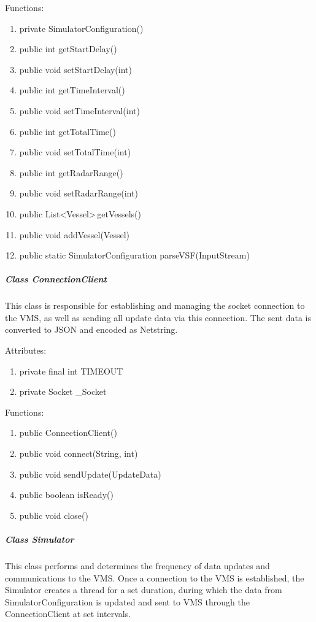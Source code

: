 \documentclass{article}
\begin{document}
\vspace{0.5cm}
Functions:
\begin{enumerate}
	\item private SimulatorConfiguration()
	\item public int getStartDelay()
	\item public void setStartDelay(int)
	\item public int getTimeInterval()
	\item public void setTimeInterval(int)
	\item public int getTotalTime()
	\item public void setTotalTime(int)
	\item public int getRadarRange()
	\item public void setRadarRange(int)
	\item public List\textless Vessel\textgreater  \,getVessels()
	\item public void addVessel(Vessel)
	\item public static SimulatorConfiguration parseVSF(InputStream)
\end{enumerate}

\break
\subparagraph{Class ConnectionClient}
This class is responsible for establishing and managing the socket connection to the VMS, as well as sending all update data via this connection. The sent data is converted to JSON and encoded as Netstring.

\vspace{0.5cm}
Attributes:
\begin{enumerate}
	\item private final int TIMEOUT
    \item private Socket \_Socket
\end {enumerate}

\vspace{0.5cm}
Functions:
\begin{enumerate}
	\item public ConnectionClient()
	\item public void connect(String, int)
	\item public void sendUpdate(UpdateData)
	\item public boolean isReady()
	\item public void close()
\end{enumerate}

\subparagraph{Class Simulator}
This class performs and determines the frequency of data updates and communications to the VMS. Once a connection to the VMS is established, the Simulator creates a thread for a set duration, during which the data from SimulatorConfiguration is updated and sent to VMS through the ConnectionClient at set intervals.
\end{document}
